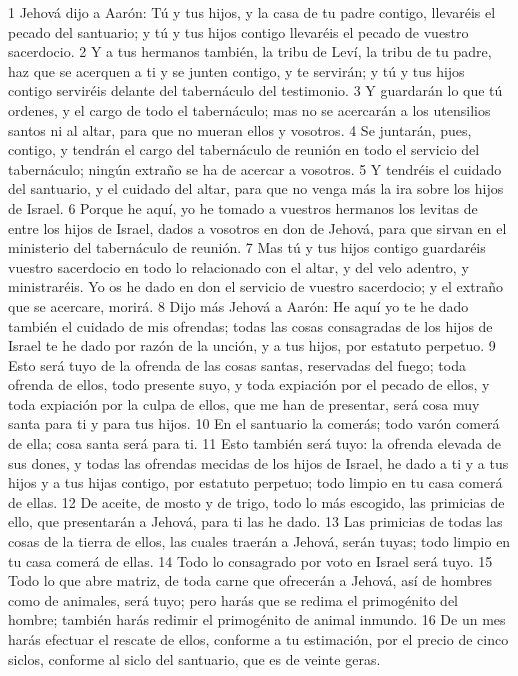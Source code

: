1 Jehová dijo a Aarón: Tú y tus hijos, y la casa de tu padre contigo, llevaréis el pecado del santuario; y tú y tus hijos contigo llevaréis el pecado de vuestro sacerdocio.
2 Y a tus hermanos también, la tribu de Leví, la tribu de tu padre, haz que se acerquen a ti y se junten contigo, y te servirán; y tú y tus hijos contigo serviréis delante del tabernáculo del testimonio.
3 Y guardarán lo que tú ordenes, y el cargo de todo el tabernáculo; mas no se acercarán a los utensilios santos ni al altar, para que no mueran ellos y vosotros.
4 Se juntarán, pues, contigo, y tendrán el cargo del tabernáculo de reunión en todo el servicio del tabernáculo; ningún extraño se ha de acercar a vosotros.
5 Y tendréis el cuidado del santuario, y el cuidado del altar, para que no venga más la ira sobre los hijos de Israel.
6 Porque he aquí, yo he tomado a vuestros hermanos los levitas de entre los hijos de Israel, dados a vosotros en don de Jehová, para que sirvan en el ministerio del tabernáculo de reunión.
7 Mas tú y tus hijos contigo guardaréis vuestro sacerdocio en todo lo relacionado con el altar, y del velo adentro, y ministraréis. Yo os he dado en don el servicio de vuestro sacerdocio; y el extraño que se acercare, morirá.
8 Dijo más Jehová a Aarón: He aquí yo te he dado también el cuidado de mis ofrendas; todas las cosas consagradas de los hijos de Israel te he dado por razón de la unción, y a tus hijos, por estatuto perpetuo.
9 Esto será tuyo de la ofrenda de las cosas santas, reservadas del fuego; toda ofrenda de ellos, todo presente suyo, y toda expiación por el pecado de ellos, y toda expiación por la culpa de ellos, que me han de presentar, será cosa muy santa para ti y para tus hijos.
10 En el santuario la comerás; todo varón comerá de ella; cosa santa será para ti.
11 Esto también será tuyo: la ofrenda elevada de sus dones, y todas las ofrendas mecidas de los hijos de Israel, he dado a ti y a tus hijos y a tus hijas contigo, por estatuto perpetuo; todo limpio en tu casa comerá de ellas.
12 De aceite, de mosto y de trigo, todo lo más escogido, las primicias de ello, que presentarán a Jehová, para ti las he dado.
13 Las primicias de todas las cosas de la tierra de ellos, las cuales traerán a Jehová, serán tuyas; todo limpio en tu casa comerá de ellas.
14 Todo lo consagrado por voto en Israel será tuyo.
15 Todo lo que abre matriz, de toda carne que ofrecerán a Jehová, así de hombres como de animales, será tuyo; pero harás que se redima el primogénito del hombre; también harás redimir el primogénito de animal inmundo.
16 De un mes harás efectuar el rescate de ellos, conforme a tu estimación, por el precio de cinco siclos,  conforme al siclo del santuario, que es de veinte geras.
